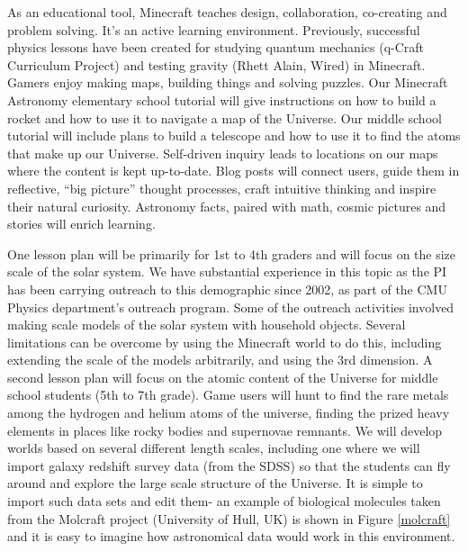 As an educational tool, Minecraft teaches design, collaboration,
co-creating and problem solving. It’s an active learning
environment. Previously, successful physics lessons have been created
for studying quantum mechanics (q-Craft Curriculum Project) and
testing gravity (Rhett Alain, Wired) in Minecraft. Gamers enjoy making
maps, building things and solving puzzles.  Our Minecraft Astronomy
elementary school tutorial will give instructions on how to build a
rocket and how to use it to navigate a map of the Universe. 
Our middle school tutorial will include plans to build a
telescope and how to use it to find the atoms that make up our
Universe. Self-driven inquiry leads to locations on our maps where the
content is kept up-to-date.  Blog posts will connect users, guide them
in reflective, “big picture” thought processes, craft intuitive
thinking and inspire their natural curiosity.  Astronomy facts, paired
with math, cosmic pictures and stories will enrich learning.
 
One lesson plan will be primarily for 1st to 4th graders and will
focus on the size scale of the solar system.  We have substantial
experience in this topic as the PI has been carrying outreach to this
demographic since 2002, as part of the CMU Physics department's
outreach program. Some of the outreach activities involved making
scale models of the solar system with household objects.  Several
limitations can be overcome by using the Minecraft world to do this,
including extending the scale of the models arbitrarily, and using the
3rd dimension.  A second lesson plan will focus on the atomic content
of the Universe for middle school students (5th to 7th grade). Game
users will hunt to find the rare metals among the hydrogen and helium
atoms of the universe, finding the prized heavy elements in places
like rocky bodies and supernovae remnants.  We will develop worlds
based on several different length scales, including one where we will
import galaxy redshift survey data (from the SDSS) so that the
students can fly around and explore the large scale structure of the
Universe.  It is simple to import such data sets and edit them- an
example of biological molecules taken from the Molcraft project
(University of Hull, UK) is shown in Figure \ref{molcraft} and it is
easy to imagine how astronomical data would work in this environment.




